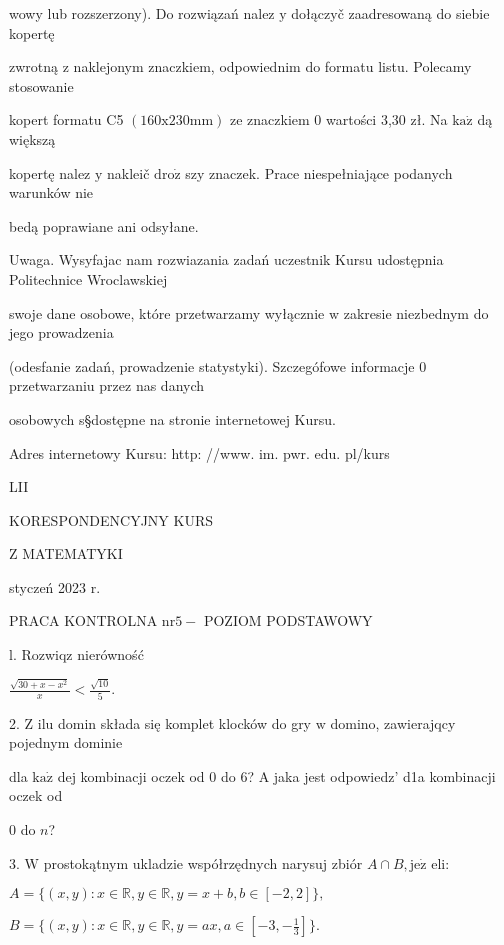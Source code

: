 \documentclass[a4paper,12pt]{article}
\begin{document}
wowy lub rozszerzony). Do rozwiązań nalez $\mathrm{y}$ dołączyč zaadresowaną do siebie kopertę

zwrotną $\mathrm{z}$ naklejonym znaczkiem, odpowiednim do formatu listu. Polecamy stosowanie

kopert formatu C5 $(160\mathrm{x}230\mathrm{m}\mathrm{m})$ ze znaczkiem $0$ wartości 3,30 zł. Na $\mathrm{k}\mathrm{a}\dot{\mathrm{z}}$ dą większą

kopertę nalez $\mathrm{y}$ nakleič $\mathrm{d}\mathrm{r}\mathrm{o}\dot{\mathrm{z}}$ szy znaczek. Prace niespełniające podanych warunków nie

bedą poprawiane ani odsyłane.

Uwaga. Wysyfajac nam rozwiazania zadań uczestnik Kursu udostępnia Politechnice Wroclawskiej

swoje dane osobowe, które przetwarzamy wyłącznie $\mathrm{w}$ zakresie niezbednym do jego prowadzenia

(odesfanie zadań, prowadzenie statystyki). Szczegófowe informacje $0$ przetwarzaniu przez nas danych

osobowych s\S dostępne na stronie internetowej Kursu.

Adres internetowy Kursu: http: //www. im. pwr. edu. pl/kurs







LII

KORESPONDENCYJNY KURS

Z MATEMATYKI

styczeń 2023 r.

PRACA KONTROLNA $\mathrm{n}\mathrm{r} 5-$ POZIOM PODSTAWOWY

l. Rozwiqz nierówność

$\displaystyle \frac{\sqrt{30+x-x^{2}}}{x}<\frac{\sqrt{10}}{5}.$

2. $\mathrm{Z}$ ilu domin składa się komplet klocków do gry $\mathrm{w}$ domino, zawierajqcy pojednym dominie

dla $\mathrm{k}\mathrm{a}\dot{\mathrm{z}}$ dej kombinacji oczek od 0 do 6? A jaka jest odpowiedz' d1a kombinacji oczek od

0 do $n$?

3. $\mathrm{W}$ prostokątnym ukladzie współrzędnych narysuj zbiór $A\cap B, \mathrm{j}\mathrm{e}\dot{\mathrm{z}}$ eli:

$A=\{(x,y):x\in \mathbb{R},y\in \mathbb{R},y=x+b,b\in[-2,2]\},$

$B=\displaystyle \{(x,y):x\in \mathbb{R},y\in \mathbb{R},y=ax,a\in[-3,-\frac{1}{3}]\}.$
\end{document}
